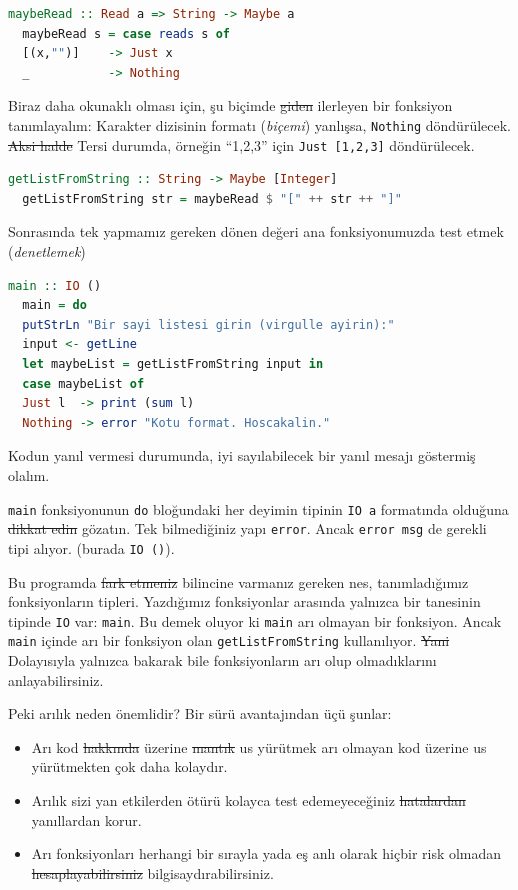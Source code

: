 \documentclass[a4paper,14pt,openany]{extbook} %
\providecommand{\tightlist}{%
  \setlength{\itemsep}{0pt}\setlength{\parskip}{0pt}}
\let\emph\textit
\begin{document}
\begin{lstlisting}[language=Haskell]
  maybeRead :: Read a => String -> Maybe a
  maybeRead s = case reads s of
  [(x,"")]    -> Just x
  _           -> Nothing
\end{lstlisting}

Biraz daha okunaklı olması için, şu biçimde \st{giden} ilerleyen bir fonksiyon
tanımlayalım: Karakter dizisinin formatı (\emph{biçemi}) yanlışsa,
\lstinline!Nothing! döndürülecek. \st{Aksi halde} Tersi durumda, örneğin ``1,2,3'' için
\lstinline!Just [1,2,3]! döndürülecek.

\begin{lstlisting}[language=Haskell]
  getListFromString :: String -> Maybe [Integer]
  getListFromString str = maybeRead $ "[" ++ str ++ "]"
\end{lstlisting}

Sonrasında tek yapmamız gereken dönen değeri ana fonksiyonumuzda test
etmek (\emph{denetlemek})

\begin{lstlisting}[language=Haskell]
  main :: IO ()
  main = do
  putStrLn "Bir sayi listesi girin (virgulle ayirin):"
  input <- getLine
  let maybeList = getListFromString input in
  case maybeList of
  Just l  -> print (sum l)
  Nothing -> error "Kotu format. Hoscakalin."
\end{lstlisting}

Kodun yanıl vermesi durumunda, iyi sayılabilecek bir yanıl mesajı göstermiş olalım.

\lstinline!main! fonksiyonunun \lstinline!do! bloğundaki her deyimin
tipinin \lstinline!IO a! formatında olduğuna \st{dikkat edin} gözatın. Tek
bilmediğiniz yapı \lstinline!error!. Ancak \lstinline!error msg! de
gerekli tipi alıyor. (burada \lstinline!IO ()!).

Bu programda \st{fark etmeniz} bilincine varmanız gereken nes,
tanımladığımız fonksiyonların tipleri.
Yazdığımız fonksiyonlar arasında yalnızca bir tanesinin tipinde
\lstinline!IO! var: \lstinline!main!. Bu demek oluyor ki
\lstinline!main! arı olmayan bir fonksiyon. Ancak \lstinline!main! içinde
arı bir fonksiyon olan \lstinline!getListFromString! kullanılıyor.
\st{Yani} Dolayısıyla yalnızca bakarak bile fonksiyonların arı olup olmadıklarını
anlayabilirsiniz.

Peki arılık neden önemlidir? Bir sürü avantajından üçü şunlar:

\begin{itemize}
  \tightlist
\item
  Arı kod \st{hakkında} üzerine \st{mantık} us yürütmek
  arı olmayan kod üzerine us
  yürütmekten çok daha kolaydır.
\item
  Arılık sizi yan etkilerden ötürü kolayca test edemeyeceğiniz
  \st{hatalardan} yanıllardan korur.
\item
  Arı fonksiyonları herhangi bir sırayla yada eş anlı olarak hiçbir
  risk olmadan \st{hesaplayabilirsiniz} bilgisaydırabilirsiniz.
\end{itemize}
\end{document}

